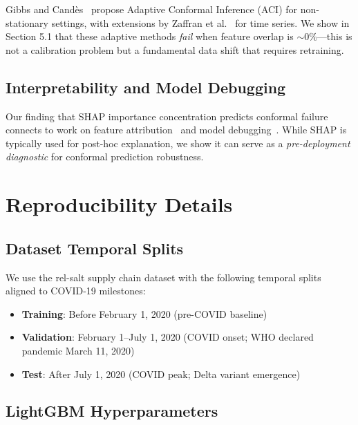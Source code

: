 Gibbs and Cand\`es~\cite{gibbs2021adaptive} propose Adaptive Conformal Inference
(ACI) for non-stationary settings, with extensions by Zaffran et
al.~\cite{zaffran2022adaptive} for time series. We show in Section 5.1
that these adaptive methods \textit{fail} when feature overlap is $\sim$0\%---this
is not a calibration problem but a fundamental data shift that requires retraining.

\subsection{Interpretability and Model Debugging}

Our finding that SHAP importance concentration predicts conformal failure
connects to work on feature attribution~\cite{lundberg2017unified} and model
debugging~\cite{adebayo2018sanity}. While SHAP is typically used for
post-hoc explanation, we show it can serve as a \textit{pre-deployment diagnostic}
for conformal prediction robustness.



\section{Reproducibility Details}
\label{app:reproducibility}

\subsection{Dataset Temporal Splits}

We use the rel-salt supply chain dataset with the following temporal splits
aligned to COVID-19 milestones:

\begin{itemize}
    \item \textbf{Training}: Before February 1, 2020 (pre-COVID baseline)
    \item \textbf{Validation}: February 1--July 1, 2020 (COVID onset; WHO
    declared pandemic March 11, 2020)
    \item \textbf{Test}: After July 1, 2020 (COVID peak; Delta variant emergence)
\end{itemize}

\subsection{LightGBM Hyperparameters}

